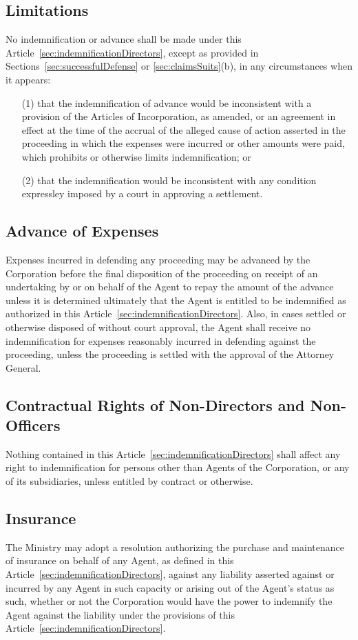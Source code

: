 \documentclass[letterpaper,titlepage]{article}
\begin{document}
\subsection{Limitations}
\label{sec:limitations2}
No indemnification or advance shall be made under this
Article~\ref{sec:indemnificationDirectors}, except as provided in
Sections~\ref{sec:successfulDefense} or \ref{sec:claimsSuits}(b), in any
circumstances when it appears:
\begin{itemize}
    \item[(1)] that the indemnification of advance would be inconsistent with a
        provision of the Articles of Incorporation, as amended, or an agreement
        in effect at the time of the accrual of the alleged cause of action
        asserted in the proceeding in which the expenses were incurred or other
        amounts were paid, which prohibits or otherwise limits indemnification;
        or
    \item[(2)] that the indemnification would be inconsistent with any condition
        expressley imposed by a court in approving a settlement.
\end{itemize}
\subsection{Advance of Expenses}
\label{sec:advanceExpenses}
Expenses incurred in defending any proceeding may be advanced by the
Corporation before the final disposition of the proceeding on receipt of an
undertaking by or on behalf of the Agent to repay the amount of the advance
unless it is determined ultimately that the Agent is entitled to be indemnified
as authorized in this Article~\ref{sec:indemnificationDirectors}. Also, in
cases settled or otherwise disposed of without court approval, the Agent shall
receive no indemnification for expenses reasonably incurred in defending
against the proceeding, unless the proceeding is settled with the approval of
the Attorney General.
\subsection{Contractual Rights of Non-Directors and Non-Officers}
\label{sec:contractualRights}
Nothing contained in this Article~\ref{sec:indemnificationDirectors} shall
affect any right to indemnification for persons other than Agents of the
Corporation, or any of its subsidiaries, unless entitled by contract or
otherwise.
\subsection{Insurance}
\label{sec:insurance}
The Ministry may adopt a resolution authorizing the purchase and maintenance of
insurance on behalf of any Agent, as defined in this
Article~\ref{sec:indemnificationDirectors}, against any liability asserted
against or incurred by any Agent in such capacity or arising out of the Agent's
status as such, whether or not the Corporation would have the power to
indemnify the Agent against the liability under the provisions of this
Article~\ref{sec:indemnificationDirectors}.
\end{document}
